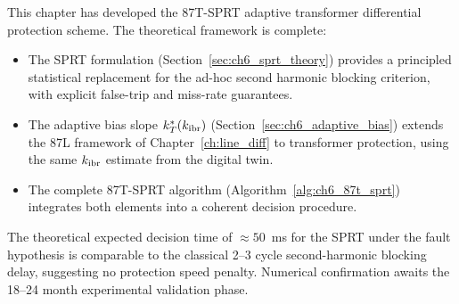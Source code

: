 This chapter has developed the 87T-SPRT adaptive transformer differential
protection scheme. The theoretical framework is complete:

\begin{itemize}
\item The SPRT formulation (Section~\ref{sec:ch6_sprt_theory}) provides
      a principled statistical replacement for the ad-hoc second harmonic
      blocking criterion, with explicit false-trip and miss-rate guarantees.
\item The adaptive bias slope $k_T^*(k_\mathrm{ibr})$ (Section~\ref{sec:ch6_adaptive_bias})
      extends the 87L framework of Chapter~\ref{ch:line_diff} to transformer
      protection, using the same $k_\mathrm{ibr}$ estimate from the digital twin.
\item The complete 87T-SPRT algorithm (Algorithm~\ref{alg:ch6_87t_sprt})
      integrates both elements into a coherent decision procedure.
\end{itemize}

The theoretical expected decision time of $\approx 50$~ms for the SPRT
under the fault hypothesis is comparable to the classical 2--3 cycle
second-harmonic blocking delay, suggesting no protection speed penalty.
Numerical confirmation awaits the 18--24 month experimental validation phase.
